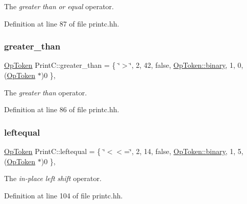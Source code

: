 The {\itshape greater} {\itshape than} {\itshape or} {\itshape equal} operator. 



Definition at line 87 of file printc.\+hh.

\mbox{\label{class_print_c_a707432f4ffaa366edf116e973e541924}} 
\subsubsection{\texorpdfstring{greater\_than}{greater\_than}}
{\footnotesize\ttfamily \mbox{\hyperlink{class_op_token}{Op\+Token}} Print\+C\+::greater\+\_\+than = \{ \char`\"{}$>$\char`\"{}, 2, 42, false, \mbox{\hyperlink{class_op_token_af41c7f108d5662ede7765c5a6c44eaffa3a2ec63522a9329a71ddbe8adc3e752d}{Op\+Token\+::binary}}, 1, 0, (\mbox{\hyperlink{class_op_token}{Op\+Token}} $\ast$)0 \}\hspace{0.3cm}{\ttfamily [static]}, {\ttfamily [protected]}}



The {\itshape greater} {\itshape than} operator. 



Definition at line 86 of file printc.\+hh.

\mbox{\label{class_print_c_ae97ed02c69f5fa9654ca613804444a3a}} 
\subsubsection{\texorpdfstring{leftequal}{leftequal}}
{\footnotesize\ttfamily \mbox{\hyperlink{class_op_token}{Op\+Token}} Print\+C\+::leftequal = \{ \char`\"{}$<$$<$=\char`\"{}, 2, 14, false, \mbox{\hyperlink{class_op_token_af41c7f108d5662ede7765c5a6c44eaffa3a2ec63522a9329a71ddbe8adc3e752d}{Op\+Token\+::binary}}, 1, 5, (\mbox{\hyperlink{class_op_token}{Op\+Token}} $\ast$)0 \}\hspace{0.3cm}{\ttfamily [static]}, {\ttfamily [protected]}}



The {\itshape in-\/place} {\itshape left} {\itshape shift} operator. 



Definition at line 104 of file printc.\+hh.

